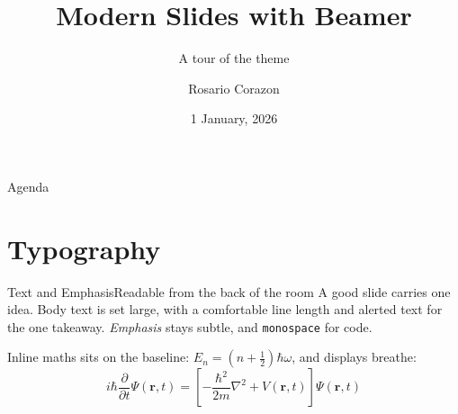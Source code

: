 \documentclass[11pt, aspectratio=169]{beamer}
\title[New Beamer]{Modern Slides with Beamer}
\subtitle{A tour of the \ThemeName{} theme}
\author[Rose C.]{Rosario Corazon}
\institute{ThemeForge}
\date[20260101]{1 January, 2026}
\begin{document}
\begin{frame}
    \titlepage    
\end{frame}


\begin{frame}{Agenda}
    \tableofcontents
\end{frame}

\section{Typography}

\begin{frame}{Text and Emphasis}{Readable from the back of the room}
    A good slide carries one idea. Body text is set large, with a comfortable line length and \alert{alerted text} for the one takeaway. \emph{Emphasis} stays subtle, and \texttt{monospace} for code.

    \medskip
    Inline maths sits on the baseline: $E_n = (n + \tfrac{1}{2})\hbar\omega$, and displays breathe:
    \[
        i\hbar \frac{\partial}{\partial t}\Psi(\mathbf{r}, t) = \left[ -\frac{\hbar^2}{2m}\nabla^2 + V(\mathbf{r}, t) \right] \Psi(\mathbf{r}, t)
    \]
\end{frame}
\end{document}
